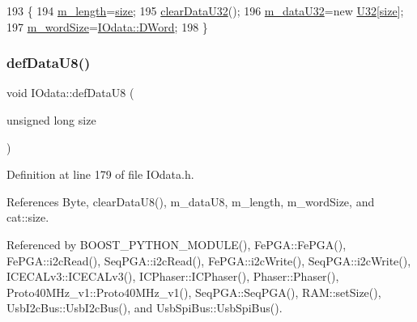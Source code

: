 \begin{DoxyCode}
193                                      \{
194     \hyperlink{classIOdata_afabe57441da019eb614d277799106aac}{m\_length}=\hyperlink{namespacecat_a3eae50bb86a614752045105e00365a46}{size};
195     \hyperlink{classIOdata_a848de1b6e7b7207dbb53c102a4d911a9}{clearDataU32}();
196     \hyperlink{classIOdata_a247cdaefd87084e3cad1d530d592d99a}{m\_dataU32}=\textcolor{keyword}{new} \hyperlink{ICECALv3_8h_a811024d35b9b8a41095b1f583b649e56}{U32}[\hyperlink{namespacecat_a3eae50bb86a614752045105e00365a46}{size}];
197     \hyperlink{classIOdata_a719b0ce607ada4fa91b12d6ecfa1b4c9}{m\_wordSize}=\hyperlink{classIOdata_a37c53ebf4bf8d866aac8af572962a84ca458da82d97e3ea9715c34b558c34f734}{IOdata::DWord};
198   \}
\end{DoxyCode}
\mbox{\label{classIOdata_a80bb230b61062b447db5832e43bf7b44}} 
\subsubsection{\texorpdfstring{def\+Data\+U8()}{defDataU8()}}
{\footnotesize\ttfamily void I\+Odata\+::def\+Data\+U8 (\begin{DoxyParamCaption}\item[{unsigned long}]{size }\end{DoxyParamCaption})\hspace{0.3cm}{\ttfamily [inline]}}



Definition at line 179 of file I\+Odata.\+h.



References Byte, clear\+Data\+U8(), m\+\_\+data\+U8, m\+\_\+length, m\+\_\+word\+Size, and cat\+::size.



Referenced by B\+O\+O\+S\+T\+\_\+\+P\+Y\+T\+H\+O\+N\+\_\+\+M\+O\+D\+U\+L\+E(), Fe\+P\+G\+A\+::\+Fe\+P\+G\+A(), Fe\+P\+G\+A\+::i2c\+Read(), Seq\+P\+G\+A\+::i2c\+Read(), Fe\+P\+G\+A\+::i2c\+Write(), Seq\+P\+G\+A\+::i2c\+Write(), I\+C\+E\+C\+A\+Lv3\+::\+I\+C\+E\+C\+A\+Lv3(), I\+C\+Phaser\+::\+I\+C\+Phaser(), Phaser\+::\+Phaser(), Proto40\+M\+Hz\+\_\+v1\+::\+Proto40\+M\+Hz\+\_\+v1(), Seq\+P\+G\+A\+::\+Seq\+P\+G\+A(), R\+A\+M\+::set\+Size(), Usb\+I2c\+Bus\+::\+Usb\+I2c\+Bus(), and Usb\+Spi\+Bus\+::\+Usb\+Spi\+Bus().


